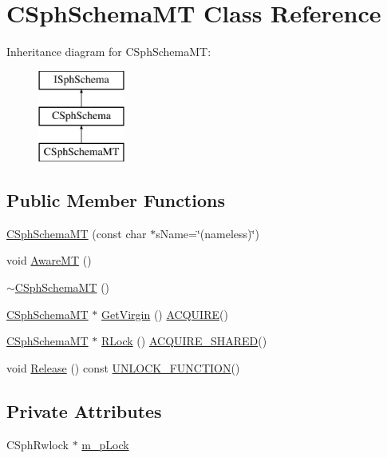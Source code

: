 \hypertarget{classCSphSchemaMT}{\section{C\-Sph\-Schema\-M\-T Class Reference}
\label{classCSphSchemaMT}
}
Inheritance diagram for C\-Sph\-Schema\-M\-T\-:\begin{figure}[H]
\begin{center}
\leavevmode
\includegraphics[height=3.000000cm]{classCSphSchemaMT}
\end{center}
\end{figure}
\subsection*{Public Member Functions}
\begin{DoxyCompactItemize}
\item 
\hyperlink{classCSphSchemaMT_a58b6faef92df7fdc63419fac1a811f17}{C\-Sph\-Schema\-M\-T} (const char $\ast$s\-Name=\char`\"{}(nameless)\char`\"{})
\item 
void \hyperlink{classCSphSchemaMT_ac77b3d1ce9b8ee4fc0c45d509b8420d7}{Aware\-M\-T} ()
\item 
\hyperlink{classCSphSchemaMT_a4647a446a554c96c3f20d2d895ed019e}{$\sim$\-C\-Sph\-Schema\-M\-T} ()
\item 
\hyperlink{classCSphSchemaMT}{C\-Sph\-Schema\-M\-T} $\ast$ \hyperlink{classCSphSchemaMT_ab2e1f61b7247bd49023d28030b5d3760}{Get\-Virgin} () \hyperlink{sphinxstd_8h_aa826316eb51d0a47bf60521c39469bed}{A\-C\-Q\-U\-I\-R\-E}()
\item 
\hyperlink{classCSphSchemaMT}{C\-Sph\-Schema\-M\-T} $\ast$ \hyperlink{classCSphSchemaMT_a0809f047df65fd7617c2f2727527686c}{R\-Lock} () \hyperlink{sphinxstd_8h_a03538b67a3c435c72dd463ab234b1913}{A\-C\-Q\-U\-I\-R\-E\-\_\-\-S\-H\-A\-R\-E\-D}()
\item 
void \hyperlink{classCSphSchemaMT_af7a2ba0bcbd17d4e1753b57c43472b83}{Release} () const \hyperlink{sphinxstd_8h_abd56e19f9b4781b1a5212a46951cf5c3}{U\-N\-L\-O\-C\-K\-\_\-\-F\-U\-N\-C\-T\-I\-O\-N}()
\end{DoxyCompactItemize}
\subsection*{Private Attributes}
\begin{DoxyCompactItemize}
\item 
C\-Sph\-Rwlock $\ast$ \hyperlink{classCSphSchemaMT_a147802056c8e0557842290835bcb005d}{m\-\_\-p\-Lock}
\end{DoxyCompactItemize}
